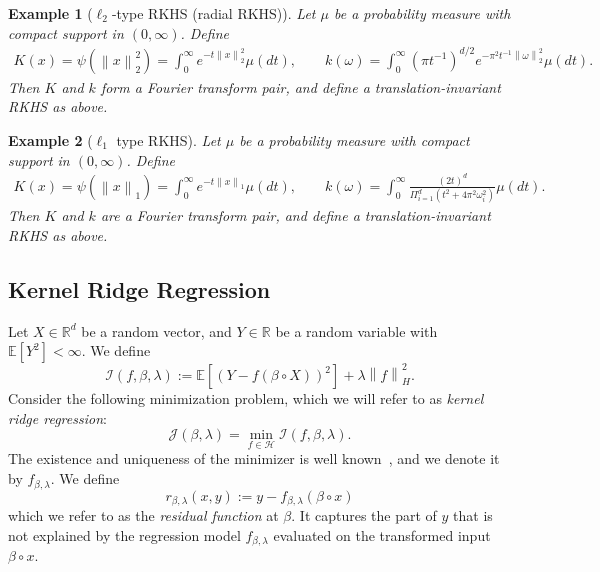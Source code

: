 \documentclass[sn-mathphys-num]{sn-jnl}%
\numberwithin{equation}{section}
\newcommand{\R}{\mathbb{R}}
\newcommand{\E}{\mathbb{E}}
\renewcommand{\H}{\mathcal{H}}
\newcommand{\kernel}{K}
\newcommand{\norm}[1]{\left\|{#1}\right\|} %
\renewcommand{\H}{\mathbb{H}}
\renewcommand{\H}{\mathcal{H}}
\newcommand{\profile}{\psi}
\theoremstyle{thmstyleone}%
\theoremstyle{thmstyletwo}%
\newtheorem{example}{Example}%
\theoremstyle{thmstylethree}%
\begin{document}
\vspace{.5em} 
\begin{example}[$\ell_2$-type RKHS (radial RKHS)]
\label{example:radial-kernel-RKHS}
Let $\mu$ be a probability measure with compact support in $(0, \infty)$. Define 
\begin{equation*}
\begin{split} 
	\kernel(x) = \profile(\norm{x}_2^2) = \int_0^\infty e^{-t\norm{x}_2^2}\mu(dt),\quad\quad
	k(\omega) = \int_0^\infty 
		(\pi t^{-1})^{d/2} e^{- \pi^2 t^{-1} \norm{\omega}_2^2}\mu(dt).
\end{split} 
\end{equation*}
Then $\kernel$ and $k$ form a Fourier transform pair, and define a translation-invariant RKHS as above. 
\end{example} 


\vspace{.5em} 
\begin{example}[$\ell_1$ type RKHS]
\label{example:ell-1-type-RKHS}
Let $\mu$ be a probability measure with compact support in $(0, \infty)$. Define 
\begin{equation*}
\begin{split} 
	\kernel(x) =\profile(\norm{x}_1) =\int_0^\infty e^{-t\norm{x}_1}\mu(dt),\quad\quad 
	k(\omega) = \int_0^\infty  \frac{(2t)^d}{\Pi_{i=1}^d (t^2+4\pi^2 \omega_i^2)} \mu(dt).
\end{split} 
\end{equation*}
Then $\kernel$ and $k$ are a Fourier transform pair, and define a translation-invariant RKHS as above. 
\end{example} 



\subsection{Kernel Ridge Regression} 
\label{sec:kernel-ridge-regression}
Let $X \in \R^d$ be a random vector, and $Y \in \R$ be a random variable with $\E[Y^2] < \infty$. 
We define 
\begin{equation*}
	\mathcal{I}(f, \beta, \lambda) :=  \E[(Y- f(\beta \circ X))^2] + \lambda \norm{f}_H^2.
\end{equation*}
Consider the following minimization problem, which we will refer to as \emph{kernel ridge regression}: 
\begin{equation*}
	\mathcal{J}(\beta, \lambda) = \min_{f \in \H} \mathcal{I}(f, \beta, \lambda).
\end{equation*}
The existence and uniqueness of the minimizer is well known~\cite{CuckerSm02}, and we denote it by
$f_{\beta, \lambda}$. 
We define 
\begin{equation*}
	r_{\beta, \lambda}(x, y) := y - f_{\beta, \lambda}(\beta \circ x)
\end{equation*}
which we refer to as the \emph{residual function} at $\beta$. It captures the part of $y$ that is not explained by 
the regression model $f_{\beta, \lambda}$ evaluated on the transformed input $\beta \circ x$. 
\end{document}
